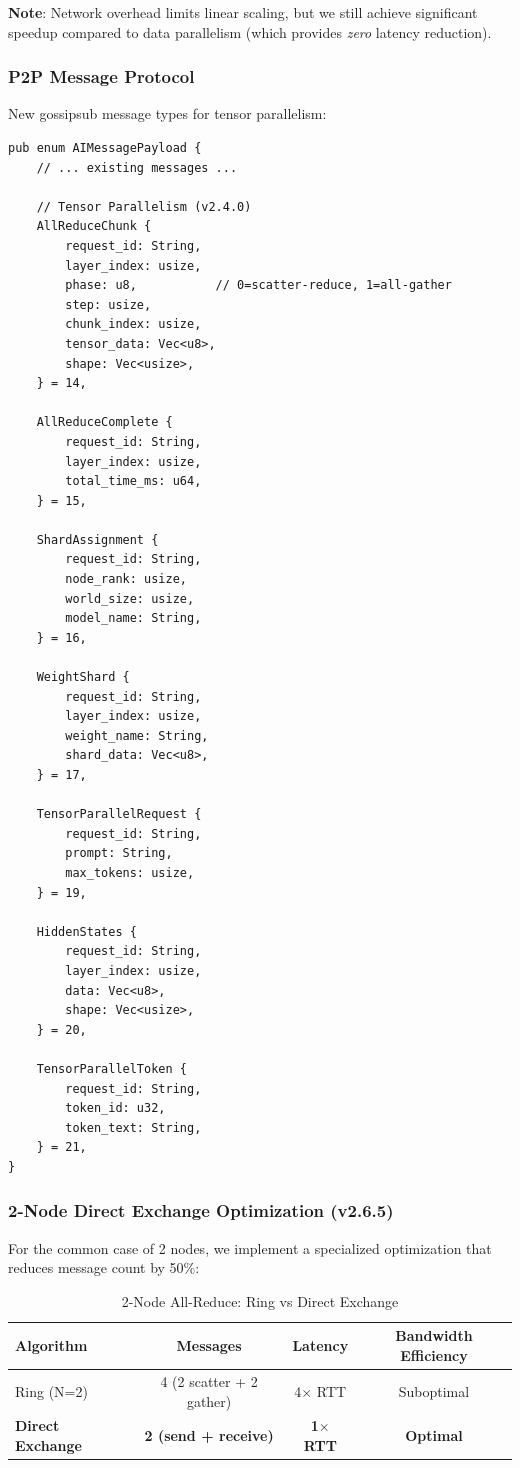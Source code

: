 \documentclass[11pt,a4paper]{article}
\begin{document}
\textbf{Note}: Network overhead limits linear scaling, but we still achieve significant speedup compared to data parallelism (which provides \textit{zero} latency reduction).

\subsubsection{P2P Message Protocol}

New gossipsub message types for tensor parallelism:

\begin{lstlisting}[caption={AIMessagePayload Tensor Parallelism Variants}]
pub enum AIMessagePayload {
    // ... existing messages ...

    // Tensor Parallelism (v2.4.0)
    AllReduceChunk {
        request_id: String,
        layer_index: usize,
        phase: u8,           // 0=scatter-reduce, 1=all-gather
        step: usize,
        chunk_index: usize,
        tensor_data: Vec<u8>,
        shape: Vec<usize>,
    } = 14,

    AllReduceComplete {
        request_id: String,
        layer_index: usize,
        total_time_ms: u64,
    } = 15,

    ShardAssignment {
        request_id: String,
        node_rank: usize,
        world_size: usize,
        model_name: String,
    } = 16,

    WeightShard {
        request_id: String,
        layer_index: usize,
        weight_name: String,
        shard_data: Vec<u8>,
    } = 17,

    TensorParallelRequest {
        request_id: String,
        prompt: String,
        max_tokens: usize,
    } = 19,

    HiddenStates {
        request_id: String,
        layer_index: usize,
        data: Vec<u8>,
        shape: Vec<usize>,
    } = 20,

    TensorParallelToken {
        request_id: String,
        token_id: u32,
        token_text: String,
    } = 21,
}
\end{lstlisting}

\subsubsection{2-Node Direct Exchange Optimization (v2.6.5)}

For the common case of 2 nodes, we implement a specialized optimization that reduces message count by 50\%:

\begin{table}[H]
\centering
\caption{2-Node All-Reduce: Ring vs Direct Exchange}
\begin{tabular}{|l|c|c|c|}
\hline
\textbf{Algorithm} & \textbf{Messages} & \textbf{Latency} & \textbf{Bandwidth Efficiency} \\
\hline
Ring (N=2) & 4 (2 scatter + 2 gather) & 4$\times$ RTT & Suboptimal \\
\textbf{Direct Exchange} & \textbf{2 (send + receive)} & \textbf{1$\times$ RTT} & \textbf{Optimal} \\
\hline
\end{tabular}
\end{table}
\end{document}
